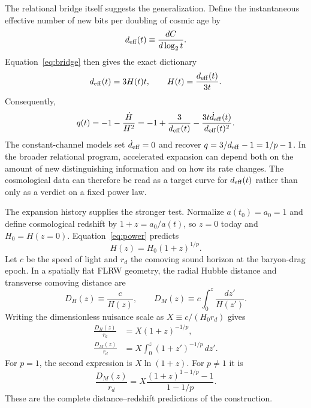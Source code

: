 \documentclass[10pt]{article}
\begin{document}
The relational bridge itself suggests the generalization.  Define the
instantaneous effective number of new bits per doubling of cosmic age by
\begin{equation}
d_{\rm eff}(t)\equiv\frac{dC}{d\log_2 t}.
\label{eq:dynamic-deff}
\end{equation}
Equation~\eqref{eq:bridge} then gives the exact dictionary
\begin{equation}
d_{\rm eff}(t)=3H(t)t,
\qquad
H(t)=\frac{d_{\rm eff}(t)}{3t}.
\label{eq:dynamic-bridge}
\end{equation}
Consequently,
\begin{equation}
q(t)=-1-\frac{\dot H}{H^2}
=-1+\frac{3}{d_{\rm eff}(t)}
-\frac{3t\dot d_{\rm eff}(t)}{d_{\rm eff}(t)^2}.
\label{eq:dynamic-q}
\end{equation}
The constant-channel models set $\dot d_{\rm eff}=0$ and recover
$q=3/d_{\rm eff}-1=1/p-1$.  In the broader relational program, accelerated
expansion can depend both on the amount of new distinguishing information and
on how its rate changes.  The cosmological data can therefore be read as a
target curve for $d_{\rm eff}(t)$ rather than only as a verdict on a fixed
power law.

The expansion history supplies the stronger test.  Normalize $a(t_0)=a_0=1$
and define cosmological redshift by $1+z=a_0/a(t)$, so $z=0$ today and
$H_0=H(z=0)$.  Equation~\eqref{eq:power} predicts
\begin{equation}
H(z)=H_0(1+z)^{1/p}.
\label{eq:hz}
\end{equation}
Let $c$ be the speed of light and $r_d$ the comoving sound horizon at the
baryon-drag epoch.  In a spatially flat FLRW geometry, the radial Hubble
distance and transverse comoving distance are
\begin{equation}
D_H(z)\equiv\frac{c}{H(z)},\qquad
D_M(z)\equiv c\int_0^z\frac{dz'}{H(z')}.
\label{eq:bao-definitions}
\end{equation}
Writing the dimensionless nuisance scale as $X\equiv c/(H_0r_d)$ gives
\begin{align}
\frac{D_H(z)}{r_d}&=X(1+z)^{-1/p},\\
\frac{D_M(z)}{r_d}&=X\int_0^z(1+z')^{-1/p}\,dz'.
\end{align}
For $p=1$, the second expression is $X\ln(1+z)$.  For $p\ne1$ it is
\begin{equation}
\frac{D_M(z)}{r_d}
=X\frac{(1+z)^{1-1/p}-1}{1-1/p}.
\end{equation}
These are the complete distance--redshift predictions of the construction.
\end{document}
